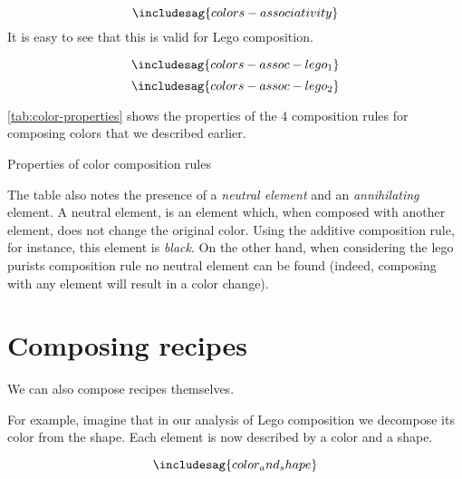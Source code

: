 \begin{equation*}
  \includesag{colors-associativity}
\end{equation*}
It is easy to see that this is valid for Lego composition.

\begin{equation*}
  \includesag{colors-assoc-lego_1}
\end{equation*}
\begin{equation*}
  \includesag{colors-assoc-lego_2}
\end{equation*}

\cref{tab:color-properties} shows the properties of the 4 composition rules for composing colors that we described earlier.


\begin{table*}
  \caption{Properties of color composition rules}
  \label{tab:color-properties}
\end{table*}

The table also notes the presence of a \emph{neutral element} and an \emph{annihilating} element.
A neutral element, is an element which, when composed with another element, does not change the original color.
Using the additive composition rule, for instance, this element is \emph{black}.
On the other hand, when considering the lego purists composition rule no neutral element can be found (indeed, composing with any element will result in a color change).



%


\section{Composing recipes}

We can also compose recipes themselves.

For example, imagine that in our analysis of Lego composition we decompose its color from the shape.
Each element is now described by a color and a shape.

\begin{equation}
  \label{eq:color-and-shape}
\includesag{color_and_shape}
\end{equation}

